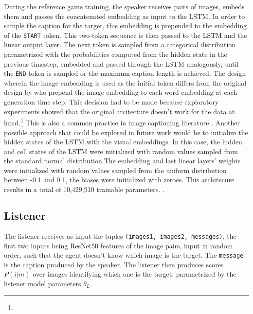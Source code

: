 During the reference game training, the speaker receives pairs of images, embeds them and passes the concatenated embedding as input to the LSTM. In order to sample the caption for the target, this embedding is prepended to the embedding of the \texttt{START} token. This two-token sequence is then passed to the LSTM and the linear output layer. The next token is sampled from a categorical distribution parametrized with the probabilities computed from the hidden state in the previous timestep, embedded and passed through the LSTM analogously, until the \texttt{END} token is sampled or the maximum caption length is achieved. The design wherein the image embedding is used as the initial token differs from the original design by \textcite{lazaridou2020multi} who prepend the image embedding to each word embedding at each generation time step. This decision had to be made because exploratory experiments showed that the original arcitecture doesn't work for the data at hand.\footnote{} This is also a common practice in image captioning literature . Another possible approach that could be explored in future work would be to initialize the hidden states of the LSTM with the visual embeddings. In this case, the hidden and cell states of the LSTM were initialized with random values sampled from the standard normal distribution.The embedding and last linear layers' weights were initialized with random values sampled from the uniform distribution between -0.1 and 0.1, the biases were initialized with zeroes.  
This architecure results in a total of 10,429,910 trainable parameters.  .

\subsection{Listener}
The listener receives as input the tuples \texttt{(images1, images2, messages)}, the first two inputs being ResNet50 features of the image pairs, input in random order, such that the agent doesn't know which image is the target. The \texttt{message} is the caption produced by the speaker. The listener then produces scores $P(i|m)$ over images identifying which one is the target, parametrized by the listener model parameters $\theta_L$.

